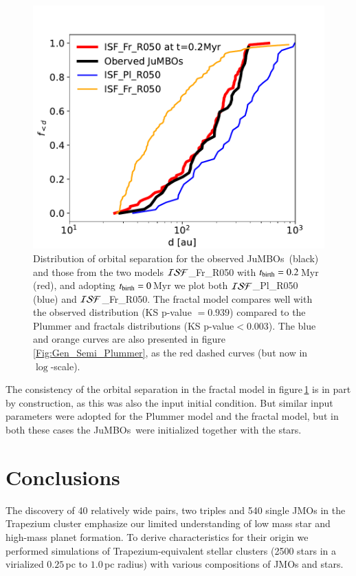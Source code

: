 \documentclass[submission,phys]{lib/SciPost}
\newcommand{\jumbos}{\mbox{JuMBOs}}
\begin{document}
\begin{figure}
    \centering
    \includegraphics[width=0.75\columnwidth]{figures/fig_orbital_separation_ISF.pdf}
    \caption{Distribution of orbital separation for the observed
      \jumbos\, (black) and those from the two models ${\cal
        ISF}$\_Fr\_R050 with $t_{\rm birth} = 0.2$\,Myr (red), and
      adopting $t_{\rm birth} = 0$\,Myr we plot both ${\cal
        ISF}$\_Pl\_R050 (blue) and ${\cal ISF}$\_Fr\_R050. The fractal
      model compares well with the observed distribution (KS p-value
      $= 0.939$) compared to the Plummer and fractals distributions
      (KS p-value$<0.003$). The blue and orange curves are also
      presented in figure\,\ref{Fig:Gen_Semi_Plummer}, as the red
      dashed curves (but now in $\log$-scale).}
    \label{Fig:orbital_separation_ISF_late_foramtion}
\end{figure}

The consistency of the orbital separation in the fractal model in
figure\,\ref{Fig:orbital_separation_ISF_late_foramtion} is in part by
construction, as this was also the input initial condition.  But
similar input parameters were adopted for the Plummer model and the
fractal model, but in both these cases the \jumbos\, were initialized
together with the stars.


\section{Conclusions}\label{Sect:Conclusions}

   
The discovery of 40 relatively wide pairs, two triples and 540 single
JMOs in the Trapezium cluster emphasize our limited understanding of
low mass star and high-mass planet formation. To derive
characteristics for their origin we performed simulations of
Trapezium-equivalent stellar clusters (2500 stars in a virialized
$0.25$\,pc to $1.0$\,pc radius) with various compositions of JMOs and
stars.
\end{document}
